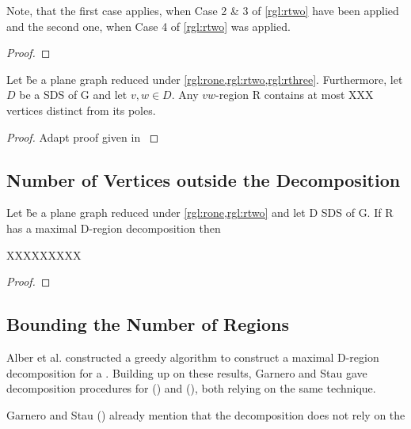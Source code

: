 Note, that the first case applies, when Case 2 \& 3 of \cref{rgl:rtwo} have been applied and the second one, when Case 4 of \cref{rgl:rtwo} was applied.
\begin{proof} 
\end{proof}


\begin{lemma}
    Let \G be a plane graph reduced under \cref{rgl:rone,rgl:rtwo,rgl:rthree}. Furthermore, let $D$ be a SDS of G and let $v,w \in D$. Any $vw$-region R contains at most XXX vertices distinct from its poles.
\end{lemma}
\begin{proof} 
    Adapt proof given in \cite*{Garnero2017}
\end{proof}

\subsection{Number of Vertices outside the Decomposition}

\begin{lemma}
Let \G be a plane graph reduced under \cref*{rgl:rone,rgl:rtwo} and let D SDS of G. If R has a maximal D-region decomposition then

XXXXXXXXX

\end{lemma}
\begin{proof} 

\end{proof}



\subsection{Bounding the Number of Regions}

Alber et al. \cite[p. ]{Alber2004} constructed a greedy algorithm to construct a maximal D-region decomposition for a \dom. Building up on these results, Garnero and Stau gave decomposition procedures for \rbdom (\cite{Garnero2017a}) and \tdom (\cite{Garnero2018}), both relying on the same technique. 

Garnero and Stau (\cite[p. 15]{Garnero2014}) already mention that the decomposition does not rely on the 

